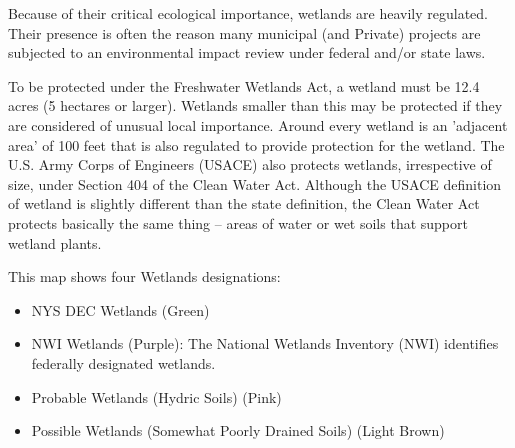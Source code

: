 Because of their critical ecological importance, wetlands are heavily regulated. Their presence is often the reason many municipal (and Private) projects are subjected to an environmental impact review under federal and/or state laws.

To be protected under the Freshwater Wetlands Act, a wetland must be 12.4 acres (5 hectares or larger). Wetlands smaller than this may be protected if they are considered of unusual local importance. Around every wetland is an 'adjacent area' of 100 feet that is also regulated to provide protection for the wetland. The U.S. Army Corps of Engineers (USACE) also protects wetlands, irrespective of size, under Section 404 of the Clean Water Act. Although the USACE definition of wetland is slightly different than the state definition, the Clean Water Act protects basically the same thing -- areas of water or wet soils that support wetland plants.

This map shows four Wetlands designations:
\begin{itemize}
   \item NYS DEC Wetlands (Green)
   \item NWI Wetlands (Purple): The National Wetlands Inventory (NWI) identifies federally designated wetlands.
   \item Probable Wetlands (Hydric Soils) (Pink)
   \item Possible Wetlands (Somewhat Poorly Drained Soils) (Light Brown)
\end{itemize}
